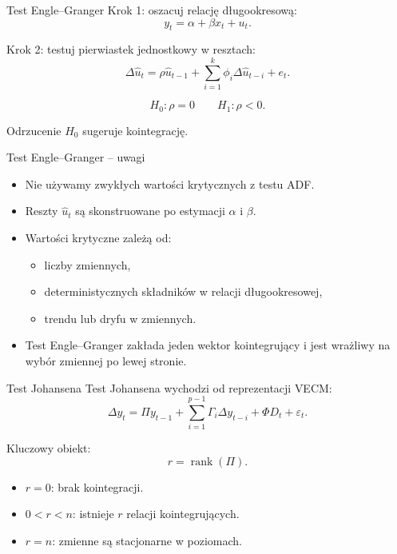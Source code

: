 \documentclass[11pt,aspectratio=169,xcolor=dvipsnames]{beamer}
\newcommand{\rank}{\operatorname{rank}}
\begin{document}
\begin{frame}{Test Engle--Granger}
  Krok 1: oszacuj relację długookresową:
  \[
    y_t = \alpha + \beta x_t + u_t.
  \]

  Krok 2: testuj pierwiastek jednostkowy w resztach:
  \[
    \Delta \hat{u}_t
      = \rho \hat{u}_{t-1}
      + \sum_{i=1}^{k}\phi_i \Delta \hat{u}_{t-i}
      + e_t.
  \]

  \[
    H_0:\rho=0
    \qquad
    H_1:\rho<0.
  \]

  Odrzucenie $H_0$ sugeruje kointegrację.
\end{frame}

\begin{frame}{Test Engle--Granger -- uwagi}
  \begin{itemize}
    \item Nie używamy zwykłych wartości krytycznych z testu ADF.
    \item Reszty $\hat{u}_t$ są skonstruowane po estymacji $\alpha$ i $\beta$.
    \item Wartości krytyczne zależą od:
      \begin{itemize}
        \item liczby zmiennych,
        \item deterministycznych składników w relacji długookresowej,
        \item trendu lub dryfu w zmiennych.
      \end{itemize}
    \item Test Engle--Granger zakłada jeden wektor kointegrujący i jest wrażliwy na wybór zmiennej po lewej stronie.
  \end{itemize}
\end{frame}

\begin{frame}{Test Johansena}
  Test Johansena wychodzi od reprezentacji VECM:
  \[
    \Delta y_t
      = \Pi y_{t-1}
      + \sum_{i=1}^{p-1}\Gamma_i \Delta y_{t-i}
      + \Phi D_t
      + \varepsilon_t.
  \]

  Kluczowy obiekt:
  \[
    r = \rank(\Pi).
  \]

  \begin{itemize}
    \item $r=0$: brak kointegracji.
    \item $0<r<n$: istnieje $r$ relacji kointegrujących.
    \item $r=n$: zmienne są stacjonarne w poziomach.
  \end{itemize}
\end{frame}
\end{document}
